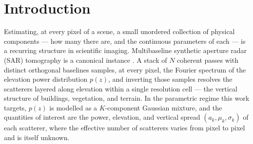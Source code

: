 \section{Introduction}
\label{sec:introduction}

Estimating, at every pixel of a scene, a small unordered collection of physical components --- how many there are, and the continuous parameters of each --- is a recurring structure in scientific imaging. Multibaseline synthetic aperture radar (SAR) tomography is a canonical instance \citep{reigber2000tomography}. A stack of $N$ coherent passes with distinct orthogonal baselines samples, at every pixel, the Fourier spectrum of the elevation power distribution $p(z)$, and inverting those samples resolves the scatterers layered along elevation within a single resolution cell --- the vertical structure of buildings, vegetation, and terrain. In the parametric regime this work targets, $p(z)$ is modelled as a $K$-component Gaussian mixture, and the quantities of interest are the power, elevation, and vertical spread $(a_k, \mu_k, \sigma_k)$ of each scatterer, where the effective number of scatterers varies from pixel to pixel and is itself unknown.

